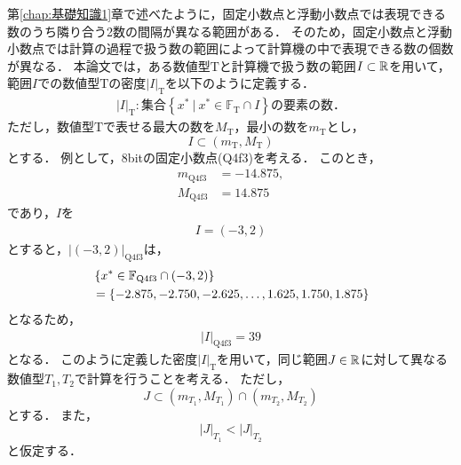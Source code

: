 第\ref{chap:基礎知識1}章で述べたように，固定小数点と浮動小数点では表現できる数のうち隣り合う2数の間隔が異なる範囲がある．
そのため，固定小数点と浮動小数点では計算の過程で扱う数の範囲によって計算機の中で表現できる数の個数が異なる． %
本論文では，ある数値型$\mathrm{T}$と計算機で扱う数の範囲$I \subset \mathbb{R}$を用いて，範囲$I$での数値型$\mathrm{T}$の密度${|I|}_{\mathrm{T}}$を以下のように定義する．
\begin{align}
    \label{eq:def_density}
    {|I|}_{\mathrm{T}}: \text{集合}\left\{x^{\ast} \ | \ x^{\ast} \in \mathbb{F}_{\mathrm{T}} \cap I \right\}\text{の要素の数．}
\end{align}
ただし，数値型$\mathrm{T}$で表せる最大の数を$M_{\mathrm{T}}$，最小の数を$m_{\mathrm{T}}$とし，
\begin{equation}
    I \subset (m_{\mathrm{T}}, M_{\mathrm{T}})
\end{equation}
とする．
例として，8bitの固定小数点(Q4f3)を考える．
このとき，
\begin{align}
    m_{\mathrm{Q}4\mathrm{f}3} &= -14.875, \\
    M_{\mathrm{Q}4\mathrm{f}3} &= 14.875
\end{align}
であり，$I$を
\begin{eqnarray}
    I = \left(-3,2\right)
\end{eqnarray}
とすると，${|\left(-3,2\right)|}_{\mathrm{Q}4\mathrm{f}3}$は，
\begin{align}
    &\left\{x^{\ast}\in \mathbb{F}_{\text{Q}{4}\text{f}{3}} \cap (-3,2)\right\} \\
    &= \left\{-2.875,-2.750,-2.625,\dots,1.625,1.750,1.875\right\}
\end{align}
となるため，
\begin{align}
    {|I|}_{\mathrm{Q}4\mathrm{f}3} = 39
\end{align}
となる．
このように定義した密度${|I|}_{\mathrm{T}}$を用いて，同じ範囲$J \in \mathbb{R}$に対して異なる数値型$T_1,T_2$で計算を行うことを考える．
ただし，
\begin{equation}
    J \subset (m_{T_1}, M_{T_1}) \cap (m_{T_2}, M_{T_2})
\end{equation}
とする．
また，
\begin{equation}
    \label{eq:density_compare}
    {|J|}_{T_1} < {|J|}_{T_2}
\end{equation}
と仮定する．

